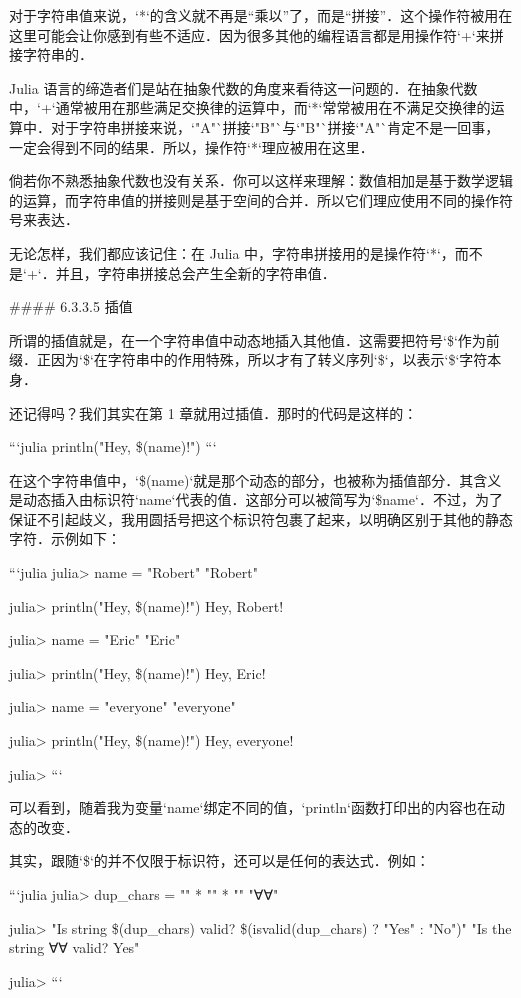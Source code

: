 对于字符串值来说，`*`的含义就不再是“乘以”了，而是“拼接”．这个操作符被用在这里可能会让你感到有些不适应．因为很多其他的编程语言都是用操作符`+`来拼接字符串的．

Julia 语言的缔造者们是站在抽象代数的角度来看待这一问题的．在抽象代数中，`+`通常被用在那些满足交换律的运算中，而`*`常常被用在不满足交换律的运算中．对于字符串拼接来说，`"A"`拼接`"B"`与`"B"`拼接`"A"`肯定不是一回事，一定会得到不同的结果．所以，操作符`*`理应被用在这里．

倘若你不熟悉抽象代数也没有关系．你可以这样来理解：数值相加是基于数学逻辑的运算，而字符串值的拼接则是基于空间的合并．所以它们理应使用不同的操作符号来表达．

无论怎样，我们都应该记住：在 Julia 中，字符串拼接用的是操作符`*`，而不是`+`．并且，字符串拼接总会产生全新的字符串值．

#### 6.3.3.5 插值

所谓的插值就是，在一个字符串值中动态地插入其他值．这需要把符号`\$`作为前缀．正因为`\$`在字符串中的作用特殊，所以才有了转义序列`\$`，以表示`\$`字符本身．

还记得吗？我们其实在第 1 章就用过插值．那时的代码是这样的：

```julia
println("Hey, \$(name)!")
```

在这个字符串值中，`\$(name)`就是那个动态的部分，也被称为插值部分．其含义是动态插入由标识符`name`代表的值．这部分可以被简写为`\$name`．不过，为了保证不引起歧义，我用圆括号把这个标识符包裹了起来，以明确区别于其他的静态字符．示例如下：

```julia
julia> name = "Robert"
"Robert"

julia> println("Hey, \$(name)!")
Hey, Robert!

julia> name = "Eric"
"Eric"

julia> println("Hey, \$(name)!")
Hey, Eric!

julia> name = "everyone"
"everyone"

julia> println("Hey, \$(name)!")
Hey, everyone!

julia> 
```

可以看到，随着我为变量`name`绑定不同的值，`println`函数打印出的内容也在动态的改变．

其实，跟随`\$`的并不仅限于标识符，还可以是任何的表达式．例如：

```julia
julia> dup_chars = "" * "" * ""
"∀∀"

julia> "Is string \$(dup_chars) valid? \$(isvalid(dup_chars) ? "Yes" : "No")"
"Is the string ∀∀ valid? Yes"

julia> 
```


